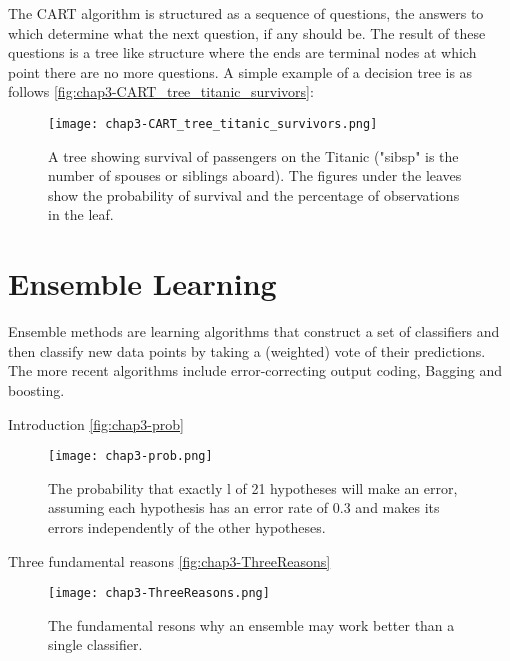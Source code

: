 \begin{compactitem}
The CART algorithm is structured as a sequence of questions, the answers to which determine what the next question, if any should be.  The result of these questions is a tree like structure where the ends are terminal nodes at which point there are no more questions.  A simple example of a decision tree is as follows \autoref{fig:chap3-CART_tree_titanic_survivors}:
\begin{figure}[ht]
  \centering
    \texttt{[image: chap3-CART\_tree\_titanic\_survivors.png]}
  \caption{A tree showing survival of passengers on the Titanic ("sibsp" is the number of spouses or siblings aboard). The figures under the leaves show the probability of survival and the percentage of observations in the leaf.}
  \label{fig:chap3-CART_tree_titanic_survivors}
\end{figure}

\end{compactitem}

\section{Ensemble Learning}
Ensemble methods are learning algorithms that construct a set of classifiers and then classify
new data points by taking a (weighted) vote of their predictions. The more recent algorithms include error-correcting output coding, Bagging and boosting.
\cite{Dietterich:2000:EMM:648054.743935}

\begin{compactitem}

\item {Introduction}
\autoref{fig:chap3-prob}

\begin{figure}[ht]
  \centering
	\texttt{[image: chap3-prob.png]}
  \caption{The probability that exactly l of 21 hypotheses will make an error, assuming each hypothesis has an
	error rate of 0.3 and makes its errors independently of the other hypotheses. }
  \label{fig:chap3-prob}
\end{figure}

\item {Three fundamental reasons}
\autoref{fig:chap3-ThreeReasons}

\begin{figure}[ht]
  \centering
    \texttt{[image: chap3-ThreeReasons.png]}
  \caption{The fundamental resons why an ensemble may work better than a single classifier. }
  \label{fig:chap3-ThreeReasons}
\end{figure}

\end{compactitem}


